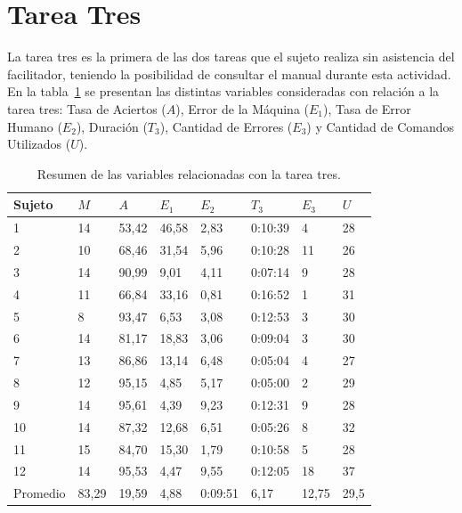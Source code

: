 \section{Tarea Tres}

La tarea tres es la primera de las dos tareas que el sujeto realiza sin asistencia del facilitador,
teniendo la posibilidad de consultar el manual durante esta actividad.
En la tabla~\ref{sec:tabla-tarea3} se presentan las distintas variables consideradas con relaci\'on
a la tarea tres: Tasa de Aciertos ($A$), Error de la M\'aquina ($E_1$),  
Tasa de Error Humano ($E_2$), Duraci\'on ($T_3$), Cantidad de Errores ($E_3$) y Cantidad de Comandos Utilizados ($U$).

\begin{table}[H]
\centering
\footnotesize
\begin{tabular}{|p{1.6cm}|p{1.6cm}|p{1.6cm}|p{1.6cm}|p{1.6cm}|p{1.6cm}|p{1.6cm}|p{1.6cm}|}
\hline
    Sujeto & $M$ &  $A$     & $E_1$    & $E_2$   & $T_3$      & $E_3$  & $U$ \\
    \hline 
    1  & 14  & 53,42  & 46,58  & 2,83 & 0:10:39 & 4  &  28 \\
    2  & 10  & 68,46  & 31,54  & 5,96 & 0:10:28 & 11 &  26 \\
    3  & 14  & 90,99  & 9,01   & 4,11 & 0:07:14 & 9  &  28 \\
    4  & 11  & 66,84  & 33,16  & 0,81 & 0:16:52 & 1  &  31 \\
    5  & 8   & 93,47  & 6,53   & 3,08 & 0:12:53 & 3  &  30 \\
    6  & 14  & 81,17  & 18,83  & 3,06 & 0:09:04 & 3  &  30 \\
    7  & 13  & 86,86  & 13,14  & 6,48 & 0:05:04 & 4  &  27 \\
    8  & 12  & 95,15  & 4,85   & 5,17 & 0:05:00 & 2  &  29 \\
    9  & 14  & 95,61  & 4,39   & 9,23 & 0:12:31 & 9  &  28 \\
    10 & 14  & 87,32  & 12,68  & 6,51 & 0:05:26 & 8  &  32 \\
    11 & 15  & 84,70  & 15,30  & 1,79 & 0:10:58 & 5  &  28 \\
    12 & 14  & 95,53  & 4,47   & 9,55 & 0:12:05 & 18 &  37 \\
\hline
  Promedio & 83,29   & 19,59 & 4,88 & 0:09:51 & 6,17 & 12,75 & 29,5   \\
\hline
\end{tabular}
\caption{Resumen de las variables relacionadas con la tarea tres.}
\label{sec:tabla-tarea3}
\end{table}

